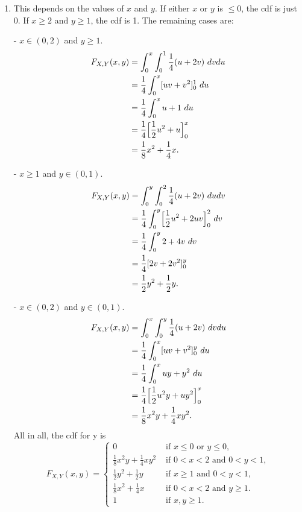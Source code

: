 \documentclass{article}
\begin{document}
\begin{enumerate}
\begin{enumerate}
        \item This depends on the values of $x$ and $y$. If either $x$ or $y$ is $\leq 0$, the cdf is just 
        0. If $x \geq 2$ and $y \geq 1$, the cdf is 1. The remaining cases are:

        - $x \in (0, 2)$ and $y \geq 1$.
        \begin{align*}
            F_{X, Y}(x, y) 
            &= \int_{0}^{x} \int_{0}^{1} \frac{1}{4}(u + 2v) \ dvdu \\
            &= \frac{1}{4} \int_{0}^{x} [uv + v^2]_0^1 \ du \\
            &= \frac{1}{4} \int_{0}^{x} u + 1 \ du \\
            &= \frac{1}{4} \Bigl[ \frac{1}{2}u^2 + u \Bigr]_0^x \\
            &= \frac{1}{8}x^2 + \frac{1}{4}x.
        \end{align*}

        - $x \geq 1$ and $y \in (0, 1)$.
        \begin{align*}
            F_{X, Y}(x, y) 
            &= \int_{0}^{y} \int_{0}^{2} \frac{1}{4}(u + 2v) \ dudv \\
            &= \frac{1}{4} \int_{0}^{y} \Bigl[ \frac{1}{2}u^2 + 2uv \Bigr]_0^2 \ dv \\
            &= \frac{1}{4} \int_{0}^{y} 2 + 4v \ dv \\
            &= \frac{1}{4} [2v + 2v^2]_0^y \\
            &= \frac{1}{2}y^2 + \frac{1}{2}y.
        \end{align*}

        - $x \in (0, 2)$ and $y \in (0, 1)$.
        \begin{align*}
            F_{X, Y}(x, y) 
            &= \int_{0}^{x} \int_{0}^{y} \frac{1}{4}(u + 2v) \ dvdu \\
            &= \frac{1}{4} \int_{0}^{x} [uv + v^2]_0^y \ du \\
            &= \frac{1}{4} \int_{0}^{x} uy + y^2 \ du \\
            &= \frac{1}{4} \Bigl[ \frac{1}{2}u^2 y + uy^2 \Bigr]_0^x \\
            &= \frac{1}{8}x^2 y + \frac{1}{4}xy^2.
        \end{align*}
        All in all, the cdf for y is 
        \[ F_{X, Y}(x, y) = \begin{cases}
            0 &\text{ if } x \leq 0 \text{ or } y \leq 0, \\
            \frac{1}{8}x^2 y + \frac{1}{4}xy^2 &\text{ if } 0 < x < 2 \text{ and } 0 < y < 1, \\
            \frac{1}{2}y^2 + \frac{1}{2}y &\text{ if } x \geq 1 \text{ and } 0 < y < 1, \\
            \frac{1}{8}x^2 + \frac{1}{4}x &\text{ if } 0 < x < 2 \text{ and } y \geq 1. \\
            1 &\text{ if } x, y \geq 1.
        \end{cases}\]


\end{enumerate}
\end{enumerate}
\end{document}
